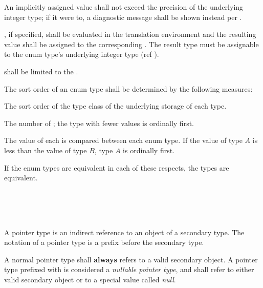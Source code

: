 \specsubsubitem
An implicitly assigned value shall not exceed the precision of the underlying
integer type; if it were to, a diagnostic message shall be shown instead per
.

\specsubsubitem
{}, if specified, shall be evaluated in the
translation environment and the resulting value shall be assigned to the
corresponding . The result type must be assignable to
the enum type's underlying integer type (ref ).

\specsubsubitem
{} shall be limited to the
.

\specsubsubitem
The sort order of an enum type shall be determined by the following measures:

\begin{subsubenumerate}
\item
The sort order of the type class of the underlying storage of each type.
\item
The number of ; the type with fewer values is
ordinally first.
\item
The value of each  is compared between each enum type.
If the value of type $A$ is less than the value of type $B$, type $A$ is
ordinally first.
\end{subsubenumerate}

If the enum types are equivalent in each of these respects, the types are
equivalent.



\begin{grammar}
 \\
	\terminal{*}  \\
	 \terminal{*}  \\
\end{grammar}

\specsubsubitem
A pointer type is an indirect reference to an object of a secondary type. The
notation of a pointer type is a \terminal{*} prefix before the secondary type.

\specsubsubitem
A normal pointer type shall \textbf{always} refers to a valid secondary object.
A pointer type prefixed with  is considered a
\textit{nullable pointer type}, and shall refer to either valid secondary object
or to a special value called \textit{null}.

